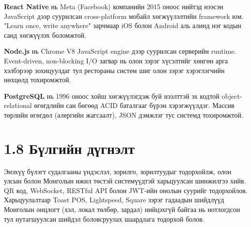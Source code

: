 \textbf{React Native} нь Meta (Facebook) компанийн 2015 оноос нийтэд нээсэн
JavaScript дээр суурилсан cross-platform мобайл хөгжүүлэлтийн framework юм.
"Learn once, write anywhere" зарчмаар iOS болон Android аль алинд нэг кодын
санд хөгжүүлэх боломжтой.

\textbf{Node.js} нь Chrome V8 JavaScript engine дээр суурилсан серверийн runtime.
Event-driven, non-blocking I/O загвар нь олон зэрэг хүсэлтийг хөнгөн арга хэлбэрээр
зохицуулдаг тул рестораны систем шиг олон зэрэг хэрэглэгчийн нөхцөлд тохиромжтой.

\textbf{PostgreSQL} нь 1996 оноос хойш хөгжүүлэгдэж буй нээлттэй эх кодтой
object-relational өгөгдлийн сан бөгөөд ACID баталгааг бүрэн хэрэгжүүлдэг.
Массив төрлийн өгөгдөл (алергийн жагсаалт), JSON дэмжлэг тус системд тохиромжтой.

\section{1.8 Бүлгийн дүгнэлт}

Энэхүү бүлэгт судалгааны үндэслэл, зорилго, зорилтуудыг тодорхойлж, олон улсын
болон Монголын ижил төстэй системүүдтэй харьцуулсан шинжилгээ хийв. QR код,
WebSocket, RESTful API болон JWT-ийн онолын суурийг тодорхойлов. Харьцуулалтаар
Toast POS, Lightspeed, Square зэрэг гадаадын шийдлүүд Монголын онцлогт
(хэл, локал төлбөр, зардал) нийцэхгүй байгаа нь нотлогдсон тул нутагшуулсан
шийдэл боловсруулах шаардлага тодорхой болов.
